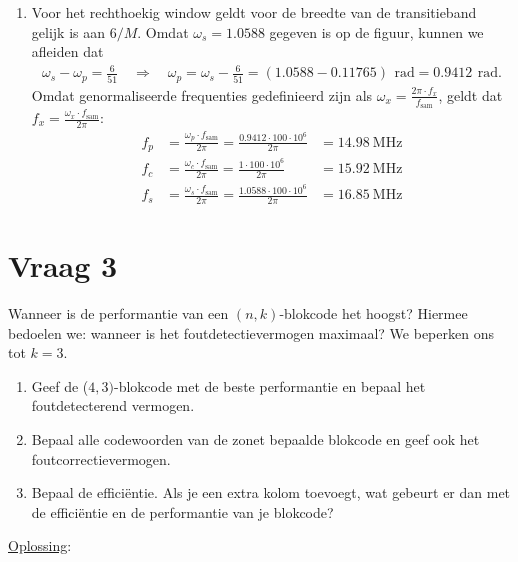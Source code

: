 \documentclass[kulak]{kulakarticle}
\begin{document}
\begin{enumerate}
		\item Voor het rechthoekig window geldt voor de breedte van de transitieband gelijk is aan \(6/M\). Omdat \(\omega_s = 1.0588\) gegeven is op de figuur, kunnen we afleiden dat \begin{align*}
			\omega_s - \omega_p = \frac{6}{51} \quad \Longrightarrow \quad \omega_p  = \omega_s - \frac{6}{51} = (1.0588-0.11765) \,\SI{}{\radian} = 0.9412 \,\SI{}{\radian}.
		\end{align*} Omdat genormaliseerde frequenties gedefinieerd zijn als \(\omega_x = \frac{2\pi \cdot f_x}{f_\text{sam}}\), geldt dat \(f_x = \frac{\omega_x \cdot f_\text{sam}}{2 \pi}\): \begin{align*}
			f_p &= \frac{\omega_p \cdot f_\text{sam}}{2 \pi} = \frac{0.9412 \cdot 100 \cdot 10^6}{2 \pi} &= \SI{14.98}{\mega\hertz}\\
			f_c &= \frac{\omega_c \cdot f_\text{sam}}{2 \pi} = \frac{1 \cdot 100 \cdot 10^6}{2 \pi} &= \SI{15.92}{\mega\hertz}\\
			f_s &= \frac{\omega_s \cdot f_\text{sam}}{2 \pi} = \frac{1.0588 \cdot 100 \cdot 10^6}{2 \pi} &= \SI{16.85}{\mega\hertz}
		\end{align*}
	\end{enumerate}

	\section*{Vraag 3}

	Wanneer is de performantie van een \((n,k)\)-blokcode het hoogst? Hiermee bedoelen we: wanneer is het foutdetectievermogen maximaal? We beperken ons tot \(k=3\).

	\begin{enumerate}
		\item Geef de (\(4,3)\)-blokcode met de beste performantie en bepaal het foutdetecterend vermogen.
		\item Bepaal alle codewoorden van de zonet bepaalde blokcode en geef ook het foutcorrectievermogen.
		\item Bepaal de efficiëntie. Als je een extra kolom toevoegt, wat gebeurt er dan met de efficiëntie en de performantie van je blokcode?
	\end{enumerate}

	\underline{Oplossing}:
\end{document}
